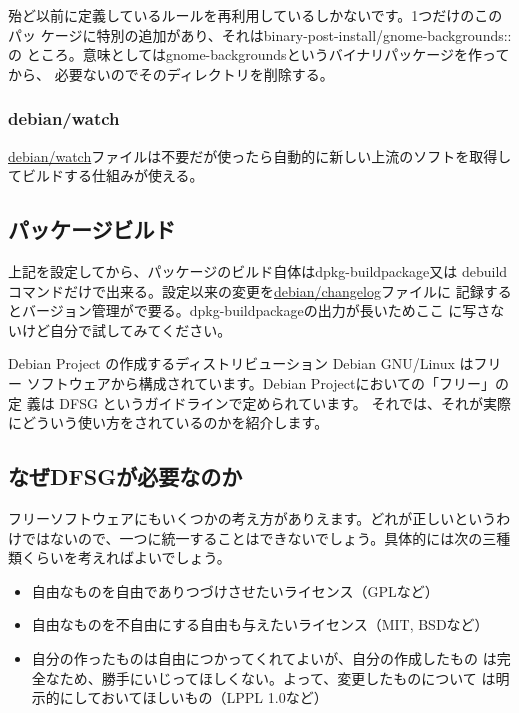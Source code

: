 \documentclass[mingoth,a4paper]{jsarticle}
\begin{document}
殆ど以前に定義しているルールを再利用しているしかないです。1つだけのこのパッ
ケージに特別の追加があり、それはbinary-post-install/gnome-backgrounds::の
ところ。意味としてはgnome-backgroundsというバイナリパッケージを作ってから、
必要ないのでそのディレクトリを削除する。

\subsubsection{debian/watch}

\url{debian/watch}ファイルは不要だが使ったら自動的に新しい上流のソフトを取得し
てビルドする仕組みが使える。

\subsection{パッケージビルド}

上記を設定してから、パッケージのビルド自体はdpkg-buildpackage又は
debuildコマンドだけで出来る。設定以来の変更を\url{debian/changelog}ファイルに
記録するとバージョン管理がで要る。dpkg-buildpackageの出力が長いためここ
に写さないけど自分で試してみてください。


\label{sec:license}

Debian Project の作成するディストリビューション Debian GNU/Linux はフリー
ソフトウェアから構成されています。Debian Projectにおいての「フリー」の定
義は DFSG というガイドラインで定められています。
それでは、それが実際にどういう使い方をされているのかを紹介します。

\subsection{なぜDFSGが必要なのか}

フリーソフトウェアにもいくつかの考え方がありえます。どれが正しいというわ
けではないので、一つに統一することはできないでしょう。具体的には次の三種
類くらいを考えればよいでしょう。

\begin{itemize}
 \item 自由なものを自由でありつづけさせたいライセンス（GPLなど）
 \item 自由なものを不自由にする自由も与えたいライセンス（MIT, BSDなど）
 \item 自分の作ったものは自由につかってくれてよいが、自分の作成したもの
       は完全なため、勝手にいじってほしくない。よって、変更したものについて
       は明示的にしておいてほしいもの（LPPL 1.0など）
\end{itemize}
\end{document}
